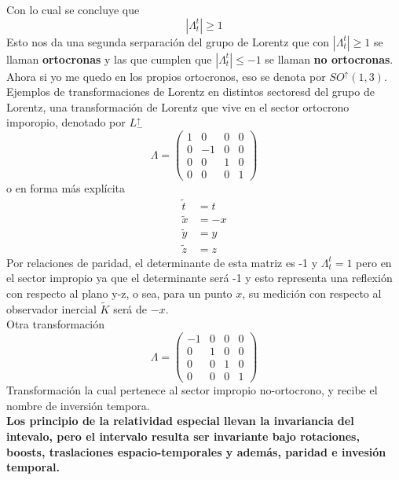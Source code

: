 \documentclass[../main.tex]{subfiles}
\begin{document}
Con lo cual se concluye que
\begin{equation}
  |\Lambda_t^t| \geq 1
 \end{equation}
 Esto nos da una segunda serparación del grupo de Lorentz que con $|\Lambda_t^t|\geq 1$ se llaman \textbf{ortocronas} y las que cumplen que $|\Lambda_t^t|\leq -1$ se llaman \textbf{no ortocronas}. Ahora si yo me quedo en los propios ortocronos, eso se denota por $SO^\uparrow(1,3)$. \\
 Ejemplos de transformaciones de Lorentz en distintos sectoresd del grupo de Lorentz, una transformación de Lorentz que vive en el sector ortocrono imporopio, denotado por $L_-^\uparrow$
 \begin{equation*}
   \Lambda = \begin{pmatrix}
     1 & 0 & 0 & 0 \\
     0 & -1 & 0 & 0 \\
     0 & 0 & 1 & 0 \\
     0 & 0 & 0 & 1
   \end{pmatrix}
 \end{equation*}
 o en forma más explícita
 \begin{align*}
   \tilde{t} & = t \\
   \tilde{x} & = -x \\
   \tilde{{y}} & = y \\
   \tilde{z} & = z
 \end{align*}
 Por relaciones de paridad, el determinante de esta matriz es -1 y $\Lambda_t^t = 1$ pero en el sector impropio ya que el determinante será -1 y esto representa una reflexión con respecto al plano y-z, o sea, para un punto $x$, su medición con respecto al observador inercial $\tilde{K}$ será de $-x$. \\
 Otra transformación 
 \begin{equation*}
   \Lambda = \begin{pmatrix}
     -1 & 0 & 0 & 0 \\
     0 & 1 & 0 & 0 \\
     0 & 0 & 1 & 0 \\
     0 & 0 & 0 & 1 
   \end{pmatrix}
 \end{equation*}
 Transformación la cual pertenece al sector impropio no-ortocrono, y recibe el nombre de inversión tempora. \\
\textbf{Los principio de la relatividad especial llevan la invariancia del intevalo, pero el intervalo resulta ser invariante bajo rotaciones, boosts, traslaciones espacio-temporales y además, paridad e invesión temporal.} \\
\end{document}
